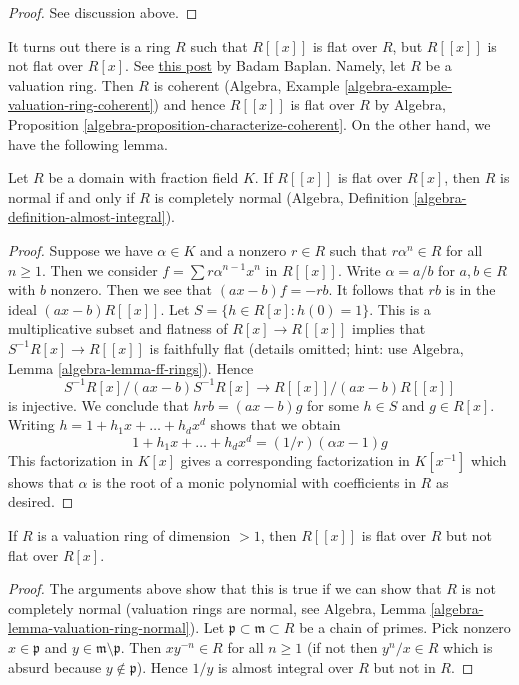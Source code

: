 \begin{proof}
See discussion above.
\end{proof}

\noindent
It turns out there is a ring $R$ such that $R[[x]]$ is flat
over $R$, but $R[[x]]$ is not flat over $R[x]$. See
\href{https://math.stackexchange.com/users/164860/badam-baplan}{this post}
by Badam Baplan. Namely, let
$R$ be a valuation ring. Then $R$ is coherent (Algebra, Example
\ref{algebra-example-valuation-ring-coherent}) and hence
$R[[x]]$ is flat over $R$ by 
Algebra, Proposition \ref{algebra-proposition-characterize-coherent}.
On the other hand, we have the following lemma.

\begin{lemma}
\label{lemma-almost-integral-when-powerseries-flat}
Let $R$ be a domain with fraction field $K$.
If $R[[x]]$ is flat over $R[x]$, then $R$ is normal if and only
if $R$ is completely normal
(Algebra, Definition \ref{algebra-definition-almost-integral}).
\end{lemma}

\begin{proof}
Suppose we have $\alpha \in K$ and a nonzero $r \in R$ such that
$r \alpha^n \in R$ for all $n \geq 1$. Then we consider
$f = \sum r \alpha^{n - 1} x^n$ in $R[[x]]$. Write $\alpha = a/b$
for $a, b \in R$ with $b$ nonzero. Then we see that $(a x - b)f = -rb$.
It follows that $rb$ is in the ideal $(ax - b)R[[x]]$.
Let $S = \{h \in R[x] : h(0) = 1\}$. This is a multiplicative subset
and flatness of $R[x] \to R[[x]]$ implies that $S^{-1}R[x] \to R[[x]]$
is faithfully flat (details omitted; hint: use Algebra, Lemma
\ref{algebra-lemma-ff-rings}). Hence
$$
S^{-1}R[x]/(ax - b)S^{-1}R[x] \to R[[x]]/(ax - b)R[[x]]
$$
is injective. We conclude that
$h rb = (ax - b) g$ for some $h \in S$ and $g \in R[x]$.
Writing $h = 1 + h_1 x + \ldots + h_d x^d$ shows that we obtain
$$
1 + h_1 x + \ldots + h_d x^d = (1/r)(\alpha x - 1)g
$$
This factorization in $K[x]$ gives a corresponding factorization
in $K[x^{-1}]$ which shows that $\alpha$ is the root of a monic
polynomial with coefficients in $R$ as desired.
\end{proof}

\begin{lemma}
\label{lemma-completion-polynomial-ring-not-flat-bis}
If $R$ is a valuation ring of dimension $> 1$, then $R[[x]]$
is flat over $R$ but not flat over $R[x]$.
\end{lemma}

\begin{proof}
The arguments above show that this is true if we can show that
$R$ is not completely normal (valuation rings are
normal, see Algebra, Lemma \ref{algebra-lemma-valuation-ring-normal}).
Let $\mathfrak p \subset \mathfrak m \subset R$ be a chain of primes.
Pick nonzero $x \in \mathfrak p$ and $y \in \mathfrak m \setminus \mathfrak p$.
Then $x y^{-n} \in R$ for all $n \geq 1$ (if not then $y^n/x \in R$
which is absurd because $y \not \in \mathfrak p$). Hence $1/y$ is
almost integral over $R$ but not in $R$.
\end{proof}

